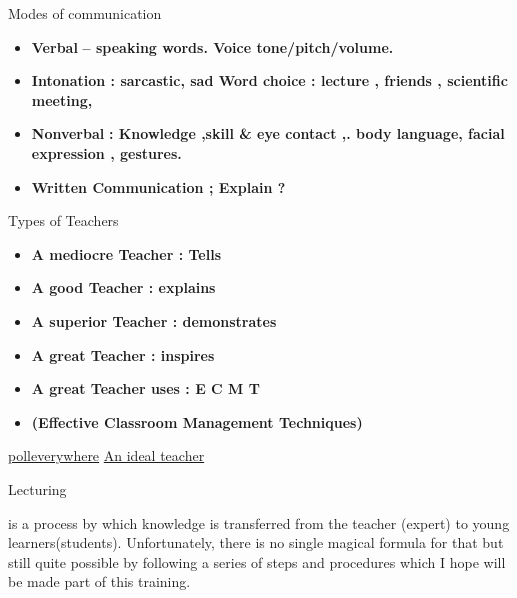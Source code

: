 \documentclass[
  ignorenonframetext,
]{beamer}
\providecommand{\tightlist}{%
  \setlength{\itemsep}{0pt}\setlength{\parskip}{0pt}}\usepackage{longtable,booktabs,array}
\begin{document}
\begin{frame}{Modes of communication}
\protect\hypertarget{modes-of-communication}{}
\begin{itemize}[<+->]
\item
  {\textbf{Verbal}} \textbf{-- speaking words. Voice tone/pitch/volume.}
\item
  \textbf{Intonation : sarcastic, sad Word choice : lecture , friends ,
  scientific meeting,}
\item
  {\textbf{Nonverbal}} \textbf{: Knowledge ,skill \& eye contact ,. body
  language, facial expression , gestures.}
\item
  {\textbf{Written Communication ; Explain ?}}
\end{itemize}
\end{frame}

\begin{frame}{Types of Teachers}
\protect\hypertarget{types-of-teachers}{}
\begin{itemize}[<+->]
\tightlist
\item
  \textbf{A mediocre Teacher : Tells}
\item
  {\textbf{A good Teacher : explains}}
\item
  \textbf{A superior Teacher : demonstrates}
\item
  {\textbf{A great Teacher : inspires}}
\item
  \textbf{A great Teacher uses : E C M T}
\item
  {\textbf{(}}\textbf{E{ffective} C{lassroom} M{anagement}
  T{echniques})}
\end{itemize}
\end{frame}

\begin{frame}{\href{pollev.com}{polleverywhere}}
\protect\hypertarget{polleverywhere}{}
\href{https://pollev-embeds.com/free_text_polls/lMfTtIjDiyJAdppRzvQbb}{An
ideal teacher}

\end{frame}

\begin{frame}{Lecturing}
\protect\hypertarget{lecturing}{}
\begin{block}{is a process by which knowledge is transferred from the
teacher {(expert)} to young learners{(students)}. Unfortunately, there
is {no single magical formula} for that but still quite possible by
following a series of steps and procedures which I hope will be made
part of this training.}
\protect\hypertarget{is-a-process-by-which-knowledge-is-transferred-from-the-teacher-expert-to-young-learnersstudents.-unfortunately-there-is-no-single-magical-formula-for-that-but-still-quite-possible-by-following-a-series-of-steps-and-procedures-which-i-hope-will-be-made-part-of-this-training.}{}
\end{block}
\end{frame}
\end{document}
